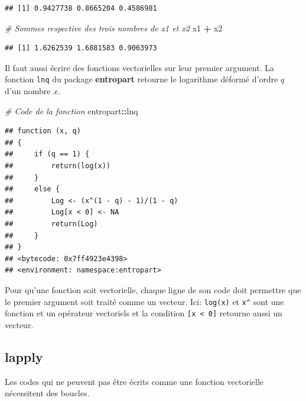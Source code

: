 \documentclass[
  12pt,
  french,
  a4paper,
  extrafontsizes,onecolumn,openright
  ]{memoir}
\newenvironment{Shaded}{\begin{snugshade}}{\end{snugshade}}
\newcommand{\CommentTok}[1]{\textcolor[rgb]{0.56,0.35,0.01}{\textit{#1}}}
\newcommand{\NormalTok}[1]{#1}
\newcommand{\OperatorTok}[1]{\textcolor[rgb]{0.81,0.36,0.00}{\textbf{#1}}}
\newcommand{\StringTok}[1]{\textcolor[rgb]{0.31,0.60,0.02}{#1}}
\begin{document}
\begin{verbatim}
## [1] 0.9427738 0.8665204 0.4586981
\end{verbatim}

\begin{Shaded}
\begin{Highlighting}[]
\CommentTok{# Sommes respective des trois nombres de x1 et x2}
\NormalTok{x1 }\OperatorTok{+}\StringTok{ }\NormalTok{x2}
\end{Highlighting}
\end{Shaded}

\begin{verbatim}
## [1] 1.6262539 1.6881583 0.9063973
\end{verbatim}

\normalsize

Il faut aussi écrire des fonctions vectorielles sur leur premier argument.
La fonction \texttt{lnq} du package \textbf{entropart} retourne le logarithme déformé d'ordre \(q\) d'un nombre \(x\).

\scriptsize

\begin{Shaded}
\begin{Highlighting}[]
\CommentTok{# Code de la fonction}
\NormalTok{entropart}\OperatorTok{::}\NormalTok{lnq}
\end{Highlighting}
\end{Shaded}

\begin{verbatim}
## function (x, q) 
## {
##     if (q == 1) {
##         return(log(x))
##     }
##     else {
##         Log <- (x^(1 - q) - 1)/(1 - q)
##         Log[x < 0] <- NA
##         return(Log)
##     }
## }
## <bytecode: 0x7ff4923e4398>
## <environment: namespace:entropart>
\end{verbatim}

\normalsize

Pour qu'une fonction soit vectorielle, chaque ligne de son code doit permettre que le premier argument soit traité comme un vecteur.
Ici: \texttt{log(x)} et \texttt{x\^{}} sont une fonction et un opérateur vectoriels et la condition \texttt{{[}x\ \textless{}\ 0{]}} retourne aussi un vecteur.

\hypertarget{lapply}{%
\subsection{lapply}\label{lapply}}

Les codes qui ne peuvent pas être écrits comme une fonction vectorielle nécessitent des boucles.
\end{document}
